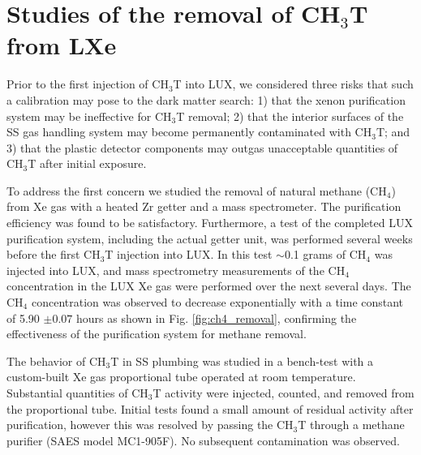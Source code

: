\section{Studies of the removal of CH$_3$T from LXe }
\label{sec:appendix1}

\newcommand*{\Scale}[2][4]{\scalebox{#1}{$#2$}}%

Prior to the first injection of CH$_3$T into LUX, we considered three risks that such a calibration may pose to the dark matter search: 1) that the xenon purification system may be ineffective for CH$_3$T removal; 2) that the interior surfaces of the SS gas handling system may become permanently contaminated with CH$_3$T; and 3) that the plastic detector components may outgas unacceptable quantities of CH$_3$T after initial exposure.

To address the first concern we studied the removal of natural methane (CH$_4$) from Xe gas with a heated Zr getter and a mass spectrometer. The purification efficiency was found to be satisfactory\cite{Dobi_CH4}. Furthermore, a test of the completed LUX purification system, including the actual getter unit, was performed several weeks before the first CH$_3$T injection into LUX. In this test $\sim$0.1 grams of CH$_4$ was injected into LUX, and mass spectrometry measurements of the CH$_4$ concentration in the LUX Xe gas were performed over the next several days. The CH$_4$ concentration was observed to decrease exponentially with a time constant of 5.90 $\pm 0.07$ hours as shown in Fig. \ref{fig:ch4_removal}, confirming the effectiveness of the purification system for methane removal.

The behavior of CH$_3$T in SS plumbing was studied in a bench-test with a custom-built Xe gas proportional tube operated at room temperature. Substantial quantities of CH$_3$T activity were injected, counted, and removed from the proportional tube. Initial tests found a small amount of residual activity after purification, however this was resolved by passing the CH$_3$T through a methane purifier (SAES model MC1-905F). No subsequent contamination was observed.


